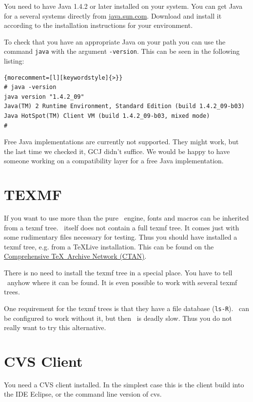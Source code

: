 \documentclass{extex-doc}
\newcommand\File[1]{\texttt{#1}}
\begin{document}
You need to have Java 1.4.2 or later installed on your
system. You can get Java for a several systems directly from
\url{java.sun.com}. Download and install it according to the
installation instructions for your environment.

To check that you have an appropriate Java on your path you can use
the command \texttt{java} with the argument \texttt{-version}. This
can be seen in the following listing:

%
\begin{lstlisting}{morecomment=[l][keywordstyle]{>}}
# java -version
java version "1.4.2_09"
Java(TM) 2 Runtime Environment, Standard Edition (build 1.4.2_09-b03)
Java HotSpot(TM) Client VM (build 1.4.2_09-b03, mixed mode)
#
\end{lstlisting}

Free Java implementations are currently not supported. They might
work, but the last time we checked it, GCJ didn't suffice. We would be
happy to have someone working on a compatibility layer for a free Java
implementation.


\section{TEXMF}

If you want to use more than the pure \ExTeX\ engine, fonts and macros
can be inherited from a texmf tree. \ExTeX\ itself does
not contain a full texmf tree. It comes just with some rudimentary
files necessary for testing. Thus you should have installed a texmf
tree, e.g. from a \TeX Live installation.
This can be found on the \href{http://www.ctan.org}{Comprehensive
  \TeX\ Archive Network (CTAN)}.

There is no need to install the texmf tree in a special place. You
have to tell \ExTeX\ anyhow where it can be found. It is even possible
to work with several texmf trees.

One requirement for the texmf trees is that they have a file database
(\File{ls-R}). \ExTeX\ can be configured to work without it, but then
\ExTeX\ is deadly slow. Thus you do not really want to try this
alternative.


\section{CVS Client}

You need a CVS client installed. In the simplest case this is the
client build into the IDE Eclipse, or the command line version of cvs.
\end{document}
